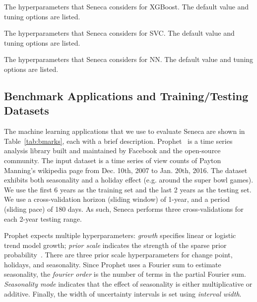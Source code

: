 \begin{table}[t]
\centering
\scriptsize

\caption{The hyperparameters that Seneca considers for XGBoost. 
The default value and tuning options are listed. 
\label{tab:xgboost_para}}
\vspace{-0.2in}
\end{table}

\begin{table}[t]
\centering
\scriptsize

\caption{The hyperparameters that Seneca considers for SVC. 
The default value and tuning options are listed. 
\label{tab:svc_para}}
\vspace{-0.2in}
\end{table}

\begin{table}[t]
\centering
\scriptsize

\caption{The hyperparameters that Seneca considers for NN.
The default value and tuning options are listed. 
\label{tab:nn_para}}
\vspace{-0.2in}
\end{table}


\subsection{Benchmark Applications and Training/Testing  Datasets}
The machine learning applications that we use to evaluate Seneca 
are shown in Table~\ref{tab:bmarks}, each with 
a brief description.
Prophet~\cite{ref:prophet} is a time series analysis library built and maintained by Facebook and the open-source community. The input dataset is a time series of view counts
of Payton Manning's wikipedia page from Dec. 10th, 2007 to Jan. 20th, 2016. 
The dataset exhibits both seasonality and a holiday effect (e.g. around the super bowl games). 
We use the first 6 years as the training set and the last 2 years as the testing set.
We use a cross-validation horizon (sliding window) of 1-year, 
and a period (sliding pace) 
of 180 days.  As such, Seneca performs three cross-validations for each 2-year testing range.

Prophet expects multiple hyperparameters: \textit{growth} specifies linear or logistic trend model growth; \textit{prior scale} indicates the strength of the 
sparse prior probability~\cite{ref:sparse_prior}. 
There are three prior scale hyperparameters for change point, holidays, and seasonality. 
Since Prophet uses a Fourier sum to estimate seasonality, 
the \textit{fourier order} is the number of terms in the partial Fourier 
sum. \textit{Seasonality mode} indicates that the effect of seasonality is either 
multiplicative or additive. Finally, the width of uncertainty intervals 
is set using \textit{interval width}.

